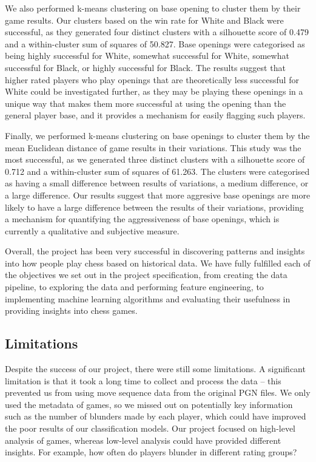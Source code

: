 \documentclass[a4paper, 11pt]{article}
\begin{document}
We also performed k-means clustering on base opening to cluster them by their game results. Our clusters based on the win rate for White and Black were successful, as they generated four distinct clusters with a silhouette score of 0.479 and a within-cluster sum of squares of 50.827. Base openings were categorised as being highly successful for White, somewhat successful for White, somewhat successful for Black, or highly successful for Black. The results suggest that higher rated players who play openings that are theoretically less successful for White could be investigated further, as they may be playing these openings in a unique way that makes them more successful at using the opening than the general player base, and it provides a mechanism for easily flagging such players.

Finally, we performed k-means clustering on base openings to cluster them by the mean Euclidean distance of game results in their variations. This study was the most successful, as we generated three distinct clusters with a silhouette score of 0.712 and a within-cluster sum of squares of 61.263. The clusters were categorised as having a small difference between results of variations, a medium difference, or a large difference. Our results suggest that more aggresive base openings are more likely to have a large difference between the results of their variations, providing a mechanism for quantifying the aggressiveness of base openings, which is currently a qualitative and subjective measure.

Overall, the project has been very successful in discovering patterns and insights into how people play chess based on historical data. We have fully fulfilled each of the objectives we set out in the project specification, from creating the data pipeline, to exploring the data and performing feature engineering, to implementing machine learning algorithms and evaluating their usefulness in providing insights into chess games.

\subsection{Limitations}
Despite the success of our project, there were still some limitations. A significant limitation is that it took a long time to collect and process the data -- this prevented us from using move sequence data from the original PGN files. We only used the metadata of games, so we missed out on potentially key information such as the number of blunders made by each player, which could have improved the poor results of our classification models. Our project focused on high-level analysis of games, whereas low-level analysis could have provided different insights. For example, how often do players blunder in different rating groups?
\end{document}
